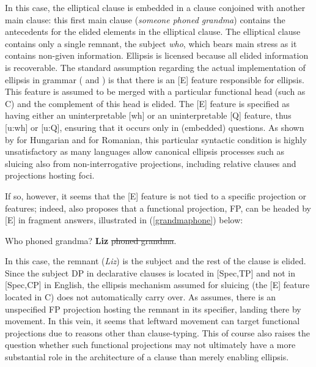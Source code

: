 In this case, the elliptical clause is embedded in a clause conjoined with another main clause: this first main clause (\textit{someone phoned grandma}) contains the antecedents for the elided elements in the elliptical clause. The elliptical clause contains only a single remnant, the subject \textit{who}, which bears main stress as it contains non-given information. Ellipsis is licensed because all elided information is recoverable. The standard assumption regarding the actual implementation of ellipsis in grammar (\citealt[55--61]{merchant2001} and \citealt[670--673]{merchant2004}) is that there is an [E] feature responsible for ellipsis. This feature is assumed to be merged with a particular functional head (such as C) and the complement of this head is elided. The [E] feature is specified as having either an uninterpretable [wh] or an uninterpretable [Q] feature, thus [u:wh] or [u:Q], ensuring that it occurs only in (embedded) questions. As shown by \citet{vancraenenbroeckliptak2006} for Hungarian and \citet{hoytteodorescu2012} for Romanian, this particular syntactic condition is highly unsatisfactory as many languages allow canonical ellipsis processes such as sluicing also from non-interrogative projections, including relative clauses and projections hosting foci.

If so, however, it seems that the [E] feature is not tied to a specific projection or features; indeed, \citet{merchant2004} also proposes that a functional projection, FP, can be headed by [E] in fragment answers, illustrated in (\ref{grandmaphone}) below:

\begin{exe}
\ex \label{grandmaphone}
\begin{xlist} 
 Who phoned grandma?
 \textbf{Liz} \sout{phoned grandma}.
\end{xlist}
\end{exe}

In this case, the remnant (\textit{Liz}) is the subject and the rest of the clause is elided. Since the subject DP in declarative clauses is located in [Spec,TP] and not in [Spec,CP] in English, the ellipsis mechanism assumed for sluicing (the [E] feature located in C) does not automatically carry over. As \citet{merchant2004} assumes, there is an unspecified FP projection hosting the remnant in its specifier, landing there by movement. In this vein, it seems that leftward movement can target functional projections due to reasons other than clause-typing. This of course also raises the question whether such functional projections may not ultimately have a more substantial role in the architecture of a clause than merely enabling ellipsis.

